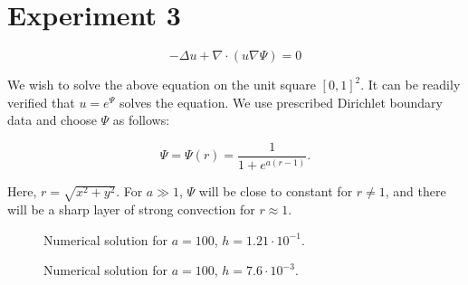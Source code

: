 \documentclass[a4paper,10pt]{article}
\begin{document}
\section{Experiment 3}

\[-\Delta u + \nabla\cdot(u\nabla\Psi) = 0\]

We wish to solve the above equation on the unit square $[0,1]^2$. It can be readily verified that
$u=e^\Psi$ solves the equation. We use prescribed Dirichlet boundary data and choose $\Psi$ as
follows:

\[\Psi=\Psi(r)=\frac{1}{1+e^{a(r-1)}}.\]

Here, $r=\sqrt{x^2+y^2}$. For $a\gg1$, $\Psi$ will be close to constant for $r\neq1$, and there
will be a sharp layer of strong convection for $r\approx1$.

\begin{figure}[!ht]
\centering
{}
\caption{Numerical solution for $a=100$, $h=1.21\cdot10^{-1}$.}
\end{figure}

\begin{figure}[!ht]
\centering
{}
\caption{Numerical solution for $a=100$, $h=7.6\cdot10^{-3}$.}
\end{figure}
\end{document}
